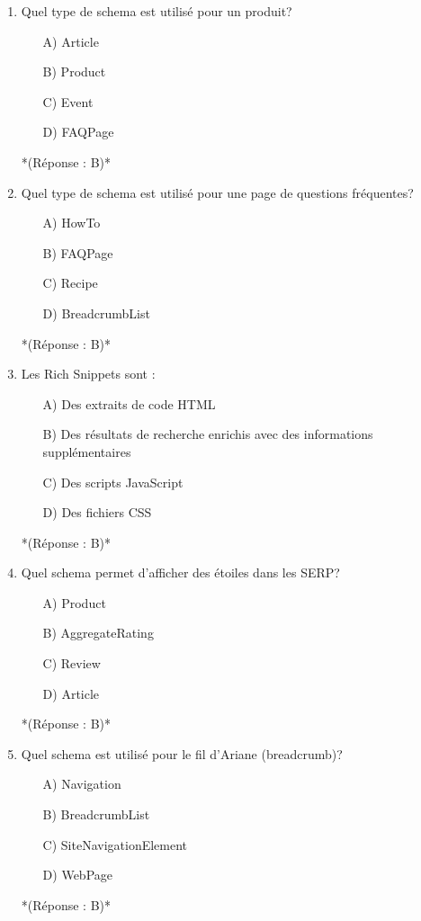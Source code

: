 \documentclass[12pt,a4paper,twoside]{report}
\begin{document}
\begin{enumerate}
\item Quel type de schema est utilisé pour un produit?
\begin{itemize}
\item[A)] Article
\item[B)] Product
\item[C)] Event
\item[D)] FAQPage
\end{itemize}
*(Réponse : B)*

\item Quel type de schema est utilisé pour une page de questions fréquentes?
\begin{itemize}
\item[A)] HowTo
\item[B)] FAQPage
\item[C)] Recipe
\item[D)] BreadcrumbList
\end{itemize}
*(Réponse : B)*

\item Les Rich Snippets sont :
\begin{itemize}
\item[A)] Des extraits de code HTML
\item[B)] Des résultats de recherche enrichis avec des informations supplémentaires
\item[C)] Des scripts JavaScript
\item[D)] Des fichiers CSS
\end{itemize}
*(Réponse : B)*

\item Quel schema permet d'afficher des étoiles dans les SERP?
\begin{itemize}
\item[A)] Product
\item[B)] AggregateRating
\item[C)] Review
\item[D)] Article
\end{itemize}
*(Réponse : B)*

\item Quel schema est utilisé pour le fil d'Ariane (breadcrumb)?
\begin{itemize}
\item[A)] Navigation
\item[B)] BreadcrumbList
\item[C)] SiteNavigationElement
\item[D)] WebPage
\end{itemize}
*(Réponse : B)*


\end{enumerate}
\end{document}
